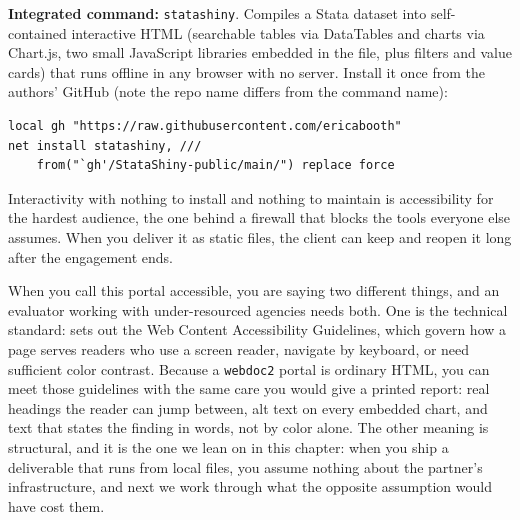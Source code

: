 \documentclass[
    a4paper,
    fontsize=10pt,
    twoside=true,
    numbers=noenddot,
]{kaobook}
\begin{document}
\begin{kaobox}[frametitle=Package Integration: \texttt{statashiny}]
\textbf{Integrated command:} \texttt{statashiny}. Compiles a Stata dataset into self-contained interactive HTML (searchable tables via DataTables and charts via Chart.js, two small JavaScript libraries embedded in the file, plus filters and value cards) that runs offline in any browser with no server. Install it once from the authors' GitHub (note the repo name differs from the command name):
\par
{\footnotesize
\begin{verbatim}
local gh "https://raw.githubusercontent.com/ericabooth"
net install statashiny, ///
    from("`gh'/StataShiny-public/main/") replace force
\end{verbatim}
}
\end{kaobox}

Interactivity with nothing to install and nothing to maintain is accessibility for the hardest audience, the one behind a firewall that blocks the tools everyone else assumes. When you deliver it as static files, the client can keep and reopen it long after the engagement ends.

When you call this portal accessible, you are saying two different things, and an evaluator working with under-resourced agencies needs both. One is the technical standard: \textcite{w3c2018wcag} sets out the Web Content Accessibility Guidelines, which govern how a page serves readers who use a screen reader, navigate by keyboard, or need sufficient color contrast. Because a \texttt{webdoc2} portal is ordinary HTML, you can meet those guidelines with the same care you would give a printed report: real headings the reader can jump between, alt text on every embedded chart, and text that states the finding in words, not by color alone. The other meaning is structural, and it is the one we lean on in this chapter: when you ship a deliverable that runs from local files, you assume nothing about the partner's infrastructure, and next we work through what the opposite assumption would have cost them.
\end{document}
